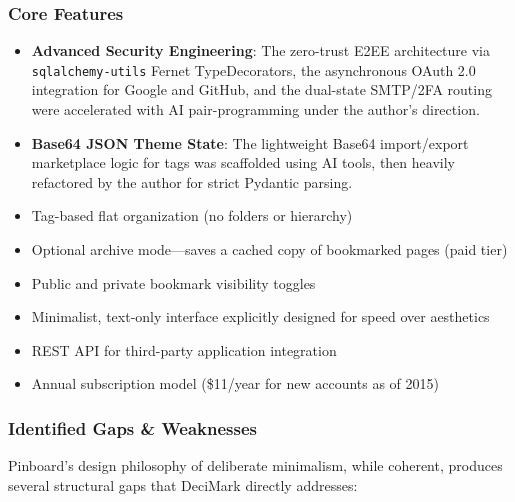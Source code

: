 \documentclass[11pt,a4paper]{book}
\begin{document}
\subsubsection{Core Features}

\begin{itemize}
  \item \textbf{Advanced Security Engineering}: The zero-trust E2EE architecture via \texttt{sqlalchemy-utils} Fernet TypeDecorators, the asynchronous OAuth 2.0 integration for Google and GitHub, and the dual-state SMTP/2FA routing were accelerated with AI pair-programming under the author's direction.
  \item \textbf{Base64 JSON Theme State}: The lightweight Base64 import/export marketplace logic for tags was scaffolded using AI tools, then heavily refactored by the author for strict Pydantic parsing.

  \item Tag-based flat organization (no folders or hierarchy)
  \item Optional archive mode---saves a cached copy of bookmarked pages (paid tier)
  \item Public and private bookmark visibility toggles
  \item Minimalist, text-only interface explicitly designed for speed over aesthetics
  \item REST API for third-party application integration
  \item Annual subscription model (\$11/year for new accounts as of 2015) \citep{pinboard2015pricing}
\end{itemize}

\subsubsection{Identified Gaps \& Weaknesses}

Pinboard's design philosophy of deliberate minimalism, while coherent, produces several structural gaps that DeciMark directly addresses:
\end{document}
